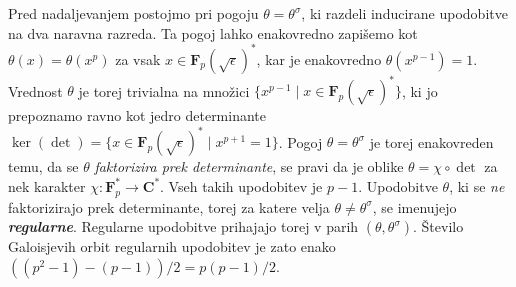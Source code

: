 \documentclass[11pt]{book}
\def\CC{\mathbf{C}}
\def\FF{\mathbf{F}}
\def\definicija{\color{rdeca}\bf\em}
\theoremstyle{definition}
\theoremstyle{zgled}
\theoremstyle{odprtproblem}
\theoremstyle{domacanaloga}
\theoremstyle{izrek}
\begin{document}
Pred nadaljevanjem postojmo pri pogoju $\theta = \theta^{\sigma}$, ki razdeli inducirane upodobitve na dva naravna razreda. Ta pogoj lahko enakovredno zapišemo kot $\theta(x) = \theta(x^{p})$ za vsak $x \in \FF_p(\sqrt{\epsilon})^*$, kar je enakovredno $\theta(x^{p-1}) = 1$. Vrednost $\theta$ je torej trivialna na množici $\{ x^{p-1} \mid x \in \FF_p(\sqrt{\epsilon})^* \}$, ki jo prepoznamo ravno kot jedro determinante $\ker(\det) = \{ x \in \FF_p(\sqrt{\epsilon})^* \mid x^{p+1} = 1 \}$. Pogoj $\theta = \theta^{\sigma}$ je torej enakovreden temu, da se $\theta$ \emph{faktorizira prek determinante}, se pravi da je oblike $\theta = \chi \circ \det$ za nek karakter $\chi \colon \FF_p^* \to \CC^*$. Vseh takih upodobitev je $p-1$. Upodobitve $\theta$, ki se \emph{ne} faktorizirajo prek determinante, torej za katere velja $\theta \neq \theta^{\sigma}$, se imenujejo {\definicija regularne}. Regularne upodobitve prihajajo torej v parih $(\theta, \theta^\sigma)$. Število Galoisjevih orbit regularnih upodobitev je zato enako $((p^2 - 1) - (p-1))/2 = p(p-1)/2$.
\end{document}
